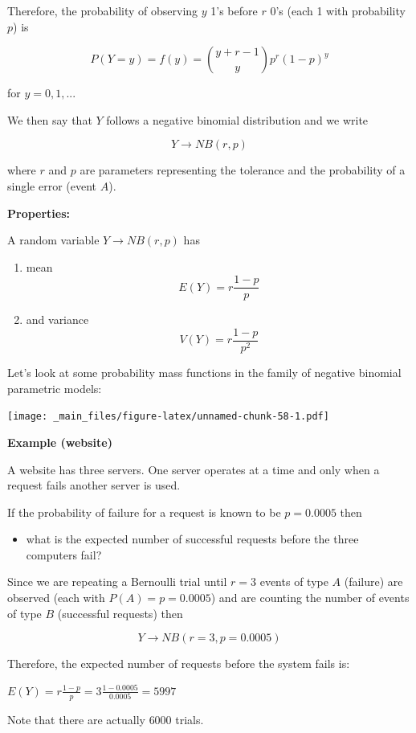 \documentclass[
]{book}
\providecommand{\tightlist}{%
  \setlength{\itemsep}{0pt}\setlength{\parskip}{0pt}}
\begin{document}
Therefore, the probability of observing \(y\) 1's before \(r\) 0's (each 1 with probability \(p\)) is

\[P(Y=y)=f(y)=\binom {y+r-1} y p^r(1-p)^y\]

for \(y=0,1,...\)

We then say that \(Y\) follows a negative binomial distribution and we write

\[Y\rightarrow NB(r,p)\]

where \(r\) and \(p\) are parameters representing the tolerance and the probability of a single error (event \(A\)).

\textbf{Properties:}

A random variable \(Y\rightarrow NB(r,p)\) has

\begin{enumerate}
\def\labelenumi{\arabic{enumi})}
\item
  mean \[E(Y)= r\frac{1-p}{p}\]
\item
  and variance \[V(Y)= r\frac{1-p}{p^2}\]
\end{enumerate}

Let's look at some probability mass functions in the family of negative binomial parametric models:

\texttt{[image: \_main\_files/figure-latex/unnamed-chunk-58-1.pdf]}

\textbf{Example (website)}

A website has three servers. One server operates at a time and only when a request fails another server is used.

If the probability of failure for a request is known to be \(p=0.0005\) then

\begin{itemize}
\tightlist
\item
  what is the expected number of successful requests before the three computers fail?
\end{itemize}

Since we are repeating a Bernoulli trial until \(r=3\) events of type \(A\) (failure) are observed (each with \(P(A)=p=0.0005\)) and are counting the number of events of type \(B\) (successful requests) then

\[Y \rightarrow NB(r=3, p=0.0005)\]

Therefore, the expected number of requests before the system fails is:

\(E(Y)=r\frac{1-p}{p}=3\frac{1-0.0005}{0.0005}=5997\)

Note that there are actually \(6000\) trials.
\end{document}
